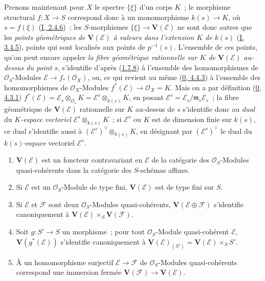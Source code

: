 \begin{env}[1.7.10]
\label{II.1.7.10-fr}
Prenons maintenant pour $X$ le spectre $\{\xi\}$ d'un corps $K$~; le
morphisme structural $f:X\to S$ correspond donc à un monomorphisme
$k(s)\to K$, où $s=f(\xi)$
(\hyperref[I.2.4.6-fr]{I, 2.4.6})~; les $S$-morphismes
$\{\xi\}\to\mathbf{V}(\mathcal{E})$ ne sont donc autres que les
\emph{points géométriques de $\mathbf{V}(\mathcal{E})$ à valeurs dans
l'extension $K$ de $k(s)$} (\hyperref[I.3.4.5-fr]{I, 3.4.5}), points qui
sont localisés aux points de $p^{-1}(s)$. L'ensemble de ces points, qu'on
peut encore appeler \emph{la fibre géométrique rationnelle sur $K$ de
$\mathbf{V}(\mathcal{E})$ au-dessus du point $s$}, s'identifie d'après
(\hyperref[II.1.7.8-fr]{1.7.8}) à l'ensemble des homomorphismes de
$\mathcal{O}_S$-Modules
$\mathcal{E}\to f_*(\mathcal{O}_X)$, ou, ce qui revient au même
(\hyperref[0.4.4.3-fr]{0, 4.4.3}) à l'ensemble des homomorphismes de
$\mathcal{O}_X$-Modules
$f^*(\mathcal{E})\to\mathcal{O}_X=K$. Mais on a par définition
(\hyperref[0.4.3.1-fr]{0, 4.3.1})
$f^*(\mathcal{E})=\mathcal{E}_s\otimes_{\mathcal{O}_s}K
=\mathcal{E}^s\otimes_{k(s)}K$, en posant
$\mathcal{E}^s=\mathcal{E}_s/\mathfrak{m}_s\mathcal{E}_s$~; la fibre
géométrique de $\mathbf{V}(\mathcal{E})$ rationnelle sur $K$ au-dessus de
$s$ s'identifie donc au \emph{dual} du \emph{$K$-espace vectoriel
$\mathcal{E}^s\otimes_{k(s)}K$}~; si $\mathcal{E}^s$ ou $K$ est de
dimension finie sur $k(s)$, ce dual s'identifie aussi à
$(\mathcal{E}^s)^\vee\otimes_{k(s)}K$, en désignant par
$(\mathcal{E}^s)^\vee$ le dual du $k(s)$-espace vectoriel
$\mathcal{E}^s$.
\end{env}

\begin{proposition}[1.7.11]
\label{II.1.7.11-fr}
\begin{enumerate}
  \item[\rm(i)] $\mathbf{V}(\mathcal{E})$ est un foncteur contravariant en
    $\mathcal{E}$ de la catégorie des $\mathcal{O}_S$-Modules
    quasi-cohérents dans la catégorie des $S$-schémas affines.
  \item[\rm(ii)] Si $\mathcal{E}$ est un $\mathcal{O}_S$-Module de type
    fini, $\mathbf{V}(\mathcal{E})$ est de type fini sur $S$.
  \item[\rm(iii)] Si $\mathcal{E}$ et $\mathcal{F}$ sont deux
    $\mathcal{O}_S$-Modules quasi-cohérents,
    $\mathbf{V}(\mathcal{E}\oplus\mathcal{F})$ s'identifie canoniquement à
    $\mathbf{V}(\mathcal{E})\times_S\mathbf{V}(\mathcal{F})$.
  \item[\rm(iv)] Soit $g:S'\to S$ un morphisme~; pour tout
    $\mathcal{O}_S$-Module quasi-cohérent $\mathcal{E}$,
    $\mathbf{V}(g^*(\mathcal{E}))$ s'identifie canoniquement à
    $\mathbf{V}(\mathcal{E})_{(S')}
    =\mathbf{V}(\mathcal{E})\times_S S'$.
  \item[\rm(v)] À un homomorphisme surjectif
    $\mathcal{E}\to\mathcal{F}$ de $\mathcal{O}_S$-Modules quasi-cohérents
    correspond une immersion fermée
    $\mathbf{V}(\mathcal{F})\to\mathbf{V}(\mathcal{E})$.
\end{enumerate}
\end{proposition}

